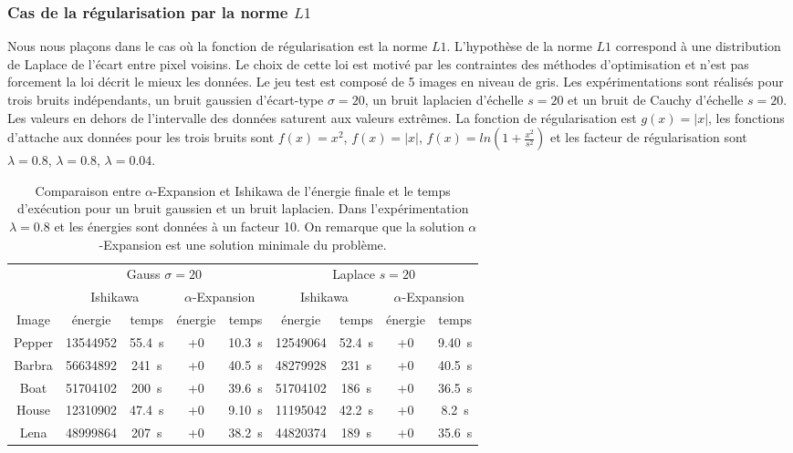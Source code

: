 \documentclass[../main/These_Mathias_Paget.tex]{subfiles}
\begin{document}
\subsubsection{Cas de la régularisation par la norme $L1$}
Nous nous plaçons dans le cas où la fonction de régularisation est la norme $L1$. L'hypothèse de la norme $L1$ correspond à une distribution de Laplace de l'écart entre pixel voisins. Le choix de cette loi est motivé par les contraintes des méthodes d'optimisation et n'est pas forcement la loi décrit le mieux les données. Le jeu test est composé de 5 images en niveau de gris. Les expérimentations sont réalisés pour trois bruits indépendants, un bruit gaussien d'écart-type $\sigma=20$, un bruit laplacien d'échelle $s=20$ et un bruit de Cauchy d'échelle $s=20$. Les valeurs en dehors de l’intervalle des données saturent aux valeurs extrêmes. La fonction de régularisation est  $g(x)=|x|$, les fonctions d'attache aux données pour les trois bruits sont $f(x)=x^2$, $f(x)=|x|$, $f(x)=ln(1+\frac{x^2}{s^2})$ et les facteur de régularisation sont $\lambda=0.8$, $\lambda=0.8$, $\lambda=0.04$. 

\begin{table}
\centering
\begin{tabular}{c|cc|cc|cc|cc}
 & \multicolumn{4}{c|}{Gauss $\sigma=20$}  & \multicolumn{4}{c}{Laplace $s=20$} \\
 & \multicolumn{2}{c|}{Ishikawa}  & \multicolumn{2}{c|}{$\alpha$-Expansion} & \multicolumn{2}{c|}{Ishikawa}  & \multicolumn{2}{c|}{$\alpha$-Expansion}  \\
Image & énergie & temps & énergie & temps & énergie & temps & énergie & temps \\
\hline
Pepper &  \num{13544952} & \SI{55,4}{s} & +\num{0} & \SI{10,3}{s} &  \num{12549064} & \SI{52,4}{s} & +\num{0} & \SI{9.40}{s}\\
Barbra & \num{56634892} & \SI{241}{s} & +\num{0} & \SI{40,5}{s} & \num{48279928} & \SI{231}{s} & +\num{0} & \SI{40,5}{s}\\
Boat & \num{51704102} & \SI{200}{s}    & +\num{0} & \SI{39.6}{s} & \num{51704102} & \SI{186}{s}    & +\num{0} & \SI{36.5}{s}\\
House & \num{12310902} & \SI{47,4}{s}    & +\num{0} & \SI{9.10}{s} & \num{11195042} & \SI{42.2}{s}    & +\num{0} & \SI{8.2}{s}\\
Lena & \num{48999864} & \SI{207}{s}    & +\num{0} & \SI{38.2}{s} & \num{44820374} & \SI{189}{s}    & +\num{0} & \SI{35.6}{s}\\
\end{tabular}
\caption{Comparaison entre $\alpha$-Expansion et Ishikawa de l'énergie finale et le temps d’exécution pour un bruit gaussien et un bruit laplacien. Dans l'expérimentation $\lambda=0.8$ et les énergies sont données à un facteur 10. On remarque que la solution $\alpha$-Expansion est une solution minimale du problème.}
\label{tab:denoise_exp_ish}
\end{table}
\end{document}
